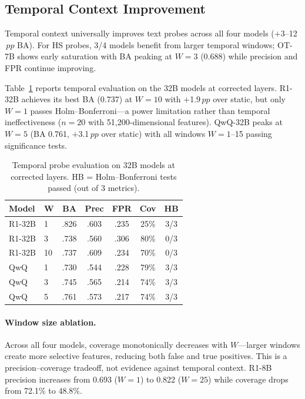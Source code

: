\documentclass[11pt,a4paper]{article}
\newcommand{\pp}{\,pp}
\begin{document}
\subsection{Temporal Context Improvement}
\label{sec:temporal}

Temporal context universally improves text probes across all four models ($+$3--12$\pp$ BA).
For HS probes, 3/4 models benefit from larger temporal windows; OT-7B shows early saturation with BA peaking at $W=3$ (0.688) while precision and FPR continue improving.

Table~\ref{tab:temporal_32b} reports temporal evaluation on the 32B models at corrected layers.
R1-32B achieves its best BA (0.737) at $W=10$ with $+$1.9$\pp$ over static, but only $W=1$ passes Holm--Bonferroni---a power limitation rather than temporal ineffectiveness ($n=20$ with 51{,}200-dimensional features).
QwQ-32B peaks at $W=5$ (BA 0.761, $+$3.1$\pp$ over static) with all windows $W=1$--15 passing significance tests.

\begin{table}[t]
\centering
\small
\begin{tabular}{llccccc}
\toprule
\textbf{Model} & \textbf{W} & \textbf{BA} & \textbf{Prec} & \textbf{FPR} & \textbf{Cov} & \textbf{HB} \\
\midrule
R1-32B & 1 & .826 & .603 & .235 & 25\% & 3/3 \\
R1-32B & 3 & .738 & .560 & .306 & 80\% & 0/3 \\
R1-32B & 10 & .737 & .609 & .234 & 70\% & 0/3 \\
QwQ & 1 & .730 & .544 & .228 & 79\% & 3/3 \\
QwQ & 3 & .745 & .565 & .214 & 74\% & 3/3 \\
QwQ & 5 & .761 & .573 & .217 & 74\% & 3/3 \\
\bottomrule
\end{tabular}
\caption{Temporal probe evaluation on 32B models at corrected layers. HB = Holm--Bonferroni tests passed (out of 3 metrics).}
\label{tab:temporal_32b}
\end{table}

\paragraph{Window size ablation.}
Across all four models, coverage monotonically decreases with $W$---larger windows create more selective features, reducing both false and true positives.
This is a precision--coverage tradeoff, not evidence against temporal context.
R1-8B precision increases from 0.693 ($W=1$) to 0.822 ($W=25$) while coverage drops from 72.1\% to 48.8\%.
\end{document}
